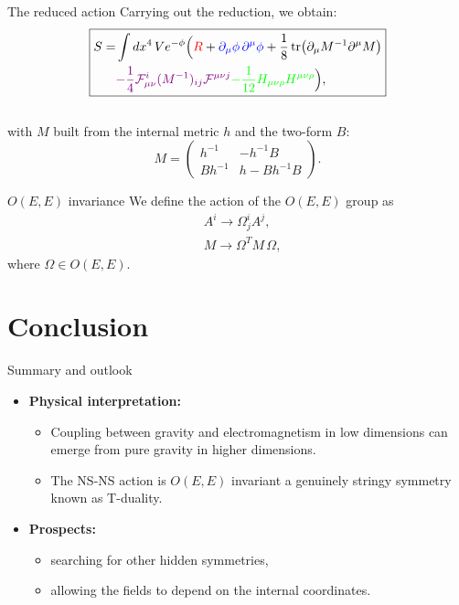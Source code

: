 \documentclass{beamer}
\begin{document}
\begin{frame}{The reduced action}
    Carrying out the reduction, we obtain:
    \begin{equation*}
        \boxed{
    \begin{aligned}
    S = &\int  dx^4\, Ve^{-\phi}\Big( \textcolor{red}{R} +\textcolor{blue}{\partial_{\mu }\phi \, \partial^{\mu} \phi }+ \frac{1}{8}\tr(\partial_\mu M^{-1}\partial^\mu M)\\ 
    & \textcolor{violet}{-\frac{1}{4} \mathcal{F}^i_{\mu \nu}(M^{-1})_{ij} \mathcal{F}^{\mu \nu j}}\textcolor{green}{-\frac{1}{12}H_{\mu \nu \rho} H^{\mu \nu \rho}} \Big),
    \end{aligned}}
\end{equation*}
 \centering{ \textcolor{red}{Low dimension gravity},  \textcolor{violet}{$E$ modified electromagnetism field},   \textcolor{blue}{Shifted dilaton field}, \textcolor{green}{low dimension two form field}   }\\
with $M$ built from the internal metric $h$ and the two-form $B$:
\begin{equation*}
     M = \begin{pmatrix}
        h^{-1} & -h^{-1}B \\ Bh^{-1} & h-Bh^{-1}B
    \end{pmatrix}.
\end{equation*}

\end{frame}
\begin{frame}{$O(E,E)$ invariance}
    We define the action of the $O(E,E)$ group as
    \begin{align*} 
    &A^i \rightarrow \Omega^i_j A^j, \\
    &M \rightarrow \Omega^T M \, \Omega,
\end{align*}
where $\Omega \in O(E,E)$. \\
\vspace{4mm}
\end{frame}
\section{Conclusion}
\begin{frame}{Summary and outlook}
    \begin{itemize}
    \item \textbf{Physical interpretation:}
    \begin{itemize}
    \item Coupling between gravity and electromagnetism in low dimensions can emerge from pure gravity in higher dimensions.
    \item The NS-NS action is $O(E,E)$ invariant a genuinely stringy symmetry known as T-duality.
\end{itemize}
\item \textbf{Prospects:}
\begin{itemize}
        \item searching for other hidden symmetries,
        \item allowing the fields to depend on the internal coordinates.
    \end{itemize}
\end{itemize}
\end{frame}
\end{document}
